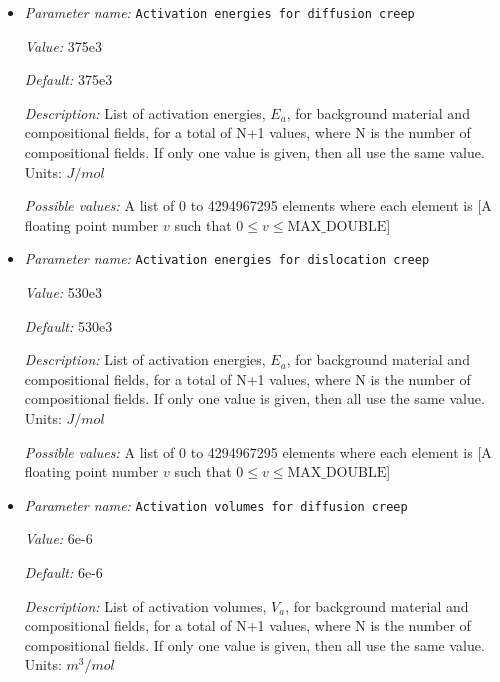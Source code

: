 \begin{itemize}
\item {\it Parameter name:} {\tt Activation energies for diffusion creep}
\label{parameters:Material model/Visco Plastic/Activation energies for diffusion creep}


{\it Value:} 375e3


{\it Default:} 375e3


{\it Description:} List of activation energies, $E_a$, for background material and compositional fields, for a total of N+1 values, where N is the number of compositional fields. If only one value is given, then all use the same value.  Units: $J / mol$


{\it Possible values:} A list of 0 to 4294967295 elements where each element is [A floating point number $v$ such that $0 \leq v \leq \text{MAX\_DOUBLE}$]
\item {\it Parameter name:} {\tt Activation energies for dislocation creep}
\label{parameters:Material model/Visco Plastic/Activation energies for dislocation creep}


{\it Value:} 530e3


{\it Default:} 530e3


{\it Description:} List of activation energies, $E_a$, for background material and compositional fields, for a total of N+1 values, where N is the number of compositional fields. If only one value is given, then all use the same value.  Units: $J / mol$


{\it Possible values:} A list of 0 to 4294967295 elements where each element is [A floating point number $v$ such that $0 \leq v \leq \text{MAX\_DOUBLE}$]
\item {\it Parameter name:} {\tt Activation volumes for diffusion creep}
\label{parameters:Material model/Visco Plastic/Activation volumes for diffusion creep}


{\it Value:} 6e-6


{\it Default:} 6e-6


{\it Description:} List of activation volumes, $V_a$, for background material and compositional fields, for a total of N+1 values, where N is the number of compositional fields. If only one value is given, then all use the same value.  Units: $m^3 / mol$



\end{itemize}
